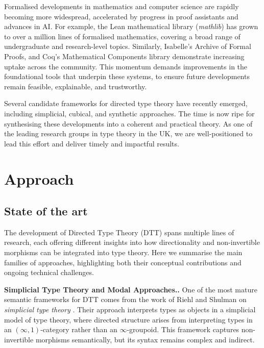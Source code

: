 \documentclass[a4paper,11pt]{article}
\renewcommand{\paragraph}[1]{\textbf{#1.}}
\begin{document}
Formalised developments in mathematics and computer science are
rapidly becoming more widespread, accelerated by progress in proof
assistants and advances in AI. For example, the Lean mathematical
library (\emph{mathlib}) has grown to over a million lines of
formalised mathematics, covering a broad range of undergraduate and
research-level topics. Similarly, 
Isabelle’s Archive of Formal Proofs, and Coq’s Mathematical Components
library demonstrate increasing uptake across the community. This
momentum demands improvements in the foundational tools that underpin
these systems, to ensure future developments remain feasible,
explainable, and trustworthy.

Several candidate frameworks for directed type theory have recently
emerged, including simplicial, cubical, and synthetic approaches. The
time is now ripe for synthesising these developments into a coherent
and practical theory. As one of the leading research groups in type
theory in the UK, we are well-positioned to lead this effort and
deliver timely and impactful results.

\section{Approach} %


\subsection{State of the art}\label{state-of-the-art}

The development of Directed Type Theory (DTT) spans multiple lines of
research, each offering different insights into how directionality and
non-invertible morphisms can be integrated into type theory. Here we
summarise the main families of approaches, highlighting both their
conceptual contributions and ongoing technical challenges.

\paragraph{Simplicial Type Theory and Modal Approaches.}
One of the most mature semantic frameworks for DTT comes from the work
of Riehl and Shulman on \emph{simplicial type theory}
\cite{riehlshulman2017}. Their approach interprets types as objects in
a simplicial model of type theory, where directed structure arises
from interpreting types in an \((\infty,1)\)-category rather than an
\(\infty\)-groupoid. This framework captures non-invertible morphisms
semantically, but its syntax remains complex and indirect.
\end{document}
